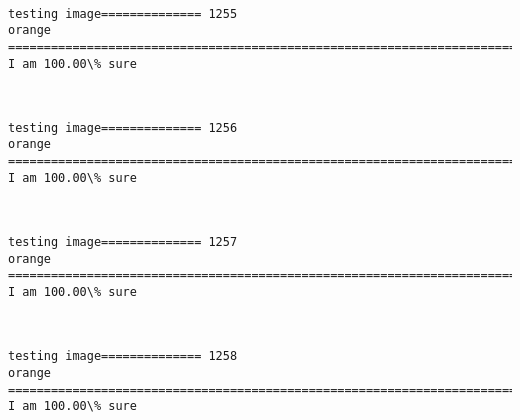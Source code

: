 \documentclass[11pt]{article}
\begin{document}
    \begin{center}
    \end{center}
    { \hspace*{\fill} \\}
    
    \begin{Verbatim}[commandchars=\\\{\}]
testing image============== 1255
orange
============================================================================
I am 100.00\% sure

    \end{Verbatim}

    \begin{center}
    \end{center}
    { \hspace*{\fill} \\}
    
    \begin{Verbatim}[commandchars=\\\{\}]
testing image============== 1256
orange
============================================================================
I am 100.00\% sure

    \end{Verbatim}

    \begin{center}
    \end{center}
    { \hspace*{\fill} \\}
    
    \begin{Verbatim}[commandchars=\\\{\}]
testing image============== 1257
orange
============================================================================
I am 100.00\% sure

    \end{Verbatim}

    \begin{center}
    \end{center}
    { \hspace*{\fill} \\}
    
    \begin{Verbatim}[commandchars=\\\{\}]
testing image============== 1258
orange
============================================================================
I am 100.00\% sure

    \end{Verbatim}
\end{document}
